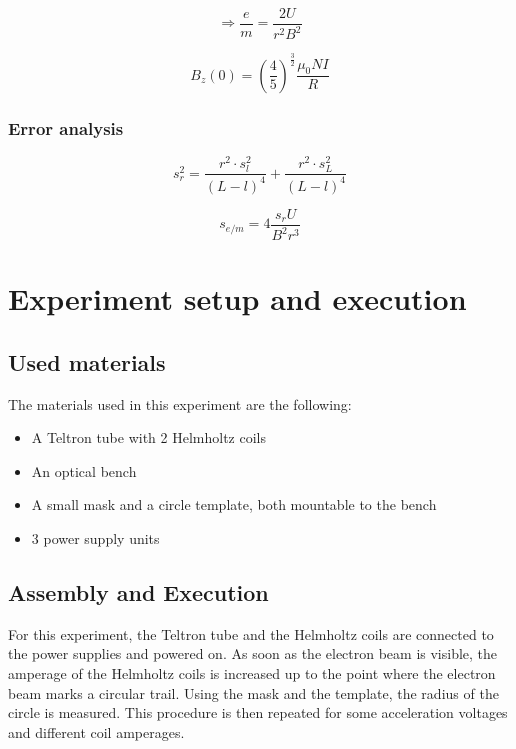 \documentclass{scrreprt}
\begin{document}
\begin{equation}
\Longrightarrow \frac{e}{m} = \frac{2 U}{r^2 B^2}
\end{equation}

\begin{equation}
B_z (0) = \left( \frac{4}{5}\right)^{\frac{3}{2}} \frac{\mu_0 N I}{R}
\end{equation}

\subsubsection{Error analysis}

\begin{equation}
s_r^2 = \frac{r^2\cdot s_l^2}{(L-l)^4} + \frac{r^2\cdot s_L^2}{(L-l)^4}
\end{equation}

\begin{equation}
s_{e/m} = 4 \frac{s_r U}{B^2 r^3}
\end{equation}

\section{Experiment setup and execution}

\subsection{Used materials}
The materials used in this experiment are the following:
\begin{itemize}
\item A Teltron tube with 2 Helmholtz coils
\item An optical bench
\item A small mask and a circle template, both mountable to the bench
\item 3 power supply units
\end{itemize}

\subsection{Assembly and Execution}
For this experiment, the Teltron tube and the Helmholtz coils are connected to the power supplies and powered on. As soon as the electron beam is visible, the amperage of the Helmholtz coils is increased up to the point where the electron beam marks a circular trail. Using the mask and the template, the radius of the circle is measured. This procedure is then repeated for some acceleration voltages and different coil amperages.
\end{document}
